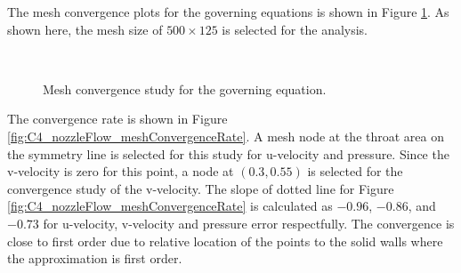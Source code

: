 The mesh convergence plots for the governing equations is shown in Figure \ref{fig:C4_nozzleFlow_meshConvergence}. As shown here, the mesh size of $500 \times 125$ is selected for the analysis.

\begin{figure}[H]
    \centering
    \quad
    \\
    \caption{Mesh convergence study for the governing equation.}
    \label{fig:C4_nozzleFlow_meshConvergence}
\end{figure}

The convergence rate is shown in Figure \ref{fig:C4_nozzleFlow_meshConvergenceRate}. A mesh node at the throat area on the symmetry line is selected for this study for u-velocity and pressure. Since the v-velocity is zero for this point, a node at $(0.3, 0
.55)$ is selected for the convergence study of the v-velocity. The slope of dotted line for Figure \ref{fig:C4_nozzleFlow_meshConvergenceRate} is calculated as $-0.96$, $-0.86$, and $-0.73$ for u-velocity, v-velocity and pressure error respectfully. The convergence is close to first order due to relative location of the points to the solid walls where the approximation is first order.

